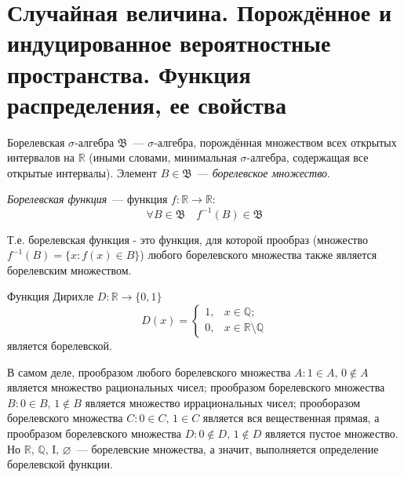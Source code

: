 \section{Случайная величина. Порождённое и индуцированное вероятностные пространства. Функция распределения, ее свойства}

\begin{defn}
    {\it $\text{Борелевская~} \sigma \text{-алгебра~} \mathfrak{B}$}~--- $\sigma \text{-алгебра}$, порождённая множеством всех открытых интервалов на $\mathbb{R}$ (иными словами, минимальная $\sigma$-алгебра, содержащая все открытые интервалы). Элемент $B \in \mathfrak{B}$~--- {\it борелевское множество}.
\end{defn}

\begin{defn}
    {\it Борелевская функция}~--- функция $f: \mathbb{R} \rightarrow \mathbb{R}$:
    \begin{equation*}
        \forall B \in \mathfrak{B} \quad f^{-1}(B) \in \mathfrak{B}
    \end{equation*}
    
    Т.е. борелевская функция - это функция, для которой прообраз (множество $f^{-1}(B) = \{x \colon f(x) \in B\}$) любого борелевского множества также является борелевским множеством.
\end{defn}

\begin{exmp}
    Функция Дирихле $D: \mathbb{R} \rightarrow \{0,1\}$
    \begin{equation*}
        D(x) =
        \begin{cases}
            1, & x \in \mathbb{Q}; \\
            0, & x \in \mathbb{R} \setminus \mathbb{Q}
        \end{cases}
    \end{equation*}
является борелевской. 

В самом деле, прообразом любого борелевского множества ${A \colon 1 \in A, \, 0 \notin A}$ является множество рациональных чисел; прообразом борелевского множества ${B \colon 0 \in B, \, 1 \notin B}$ является множество иррациональных чисел; прооборазом борелевского множества ${C \colon 0 \in C, \, 1 \in C}$ является вся вещественная прямая, а прообразом борелевского множества ${D \colon 0 \notin D, \, 1 \notin D}$ является пустое множество. Но $\mathbb{R}, \, \mathbb{Q}, \, \mathrm{I}, \, \varnothing $~--- борелевские множества, а значит, выполняется определение борелевской функции.
\end{exmp}

